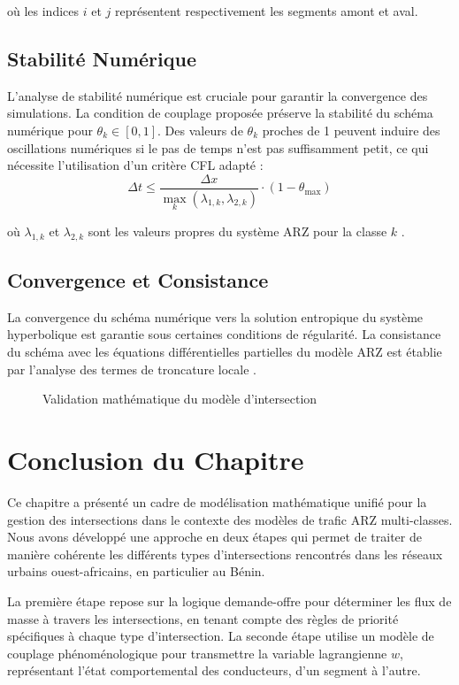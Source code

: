 où les indices $ i $ et $ j $ représentent respectivement les segments amont et aval.

\subsection{Stabilité Numérique}
L'analyse de stabilité numérique est cruciale pour garantir la convergence des simulations. La condition de couplage proposée préserve la stabilité du schéma numérique pour $ \theta_k \in [0,1] $. Des valeurs de $ \theta_k $ proches de 1 peuvent induire des oscillations numériques si le pas de temps n'est pas suffisamment petit, ce qui nécessite l'utilisation d'un critère CFL adapté :
\[
\Delta t \leq \frac{\Delta x}{\max_k(\lambda_{1,k}, \lambda_{2,k})} \cdot (1 - \theta_{\max})
\]

où $ \lambda_{1,k} $ et $ \lambda_{2,k} $ sont les valeurs propres du système ARZ pour la classe $ k $ \cite{FanHertySeibold2014}.

\subsection{Convergence et Consistance}
La convergence du schéma numérique vers la solution entropique du système hyperbolique est garantie sous certaines conditions de régularité. La consistance du schéma avec les équations différentielles partielles du modèle ARZ est établie par l'analyse des termes de troncature locale \cite{HoldenRisebro2015}.

\begin{figure}[htbp]
\centering
\caption{Validation mathématique du modèle d'intersection}
\label{fig:validation_mathematique}
\end{figure}

\section{Conclusion du Chapitre}
Ce chapitre a présenté un cadre de modélisation mathématique unifié pour la gestion des intersections dans le contexte des modèles de trafic ARZ multi-classes. Nous avons développé une approche en deux étapes qui permet de traiter de manière cohérente les différents types d'intersections rencontrés dans les réseaux urbains ouest-africains, en particulier au Bénin.

La première étape repose sur la logique demande-offre pour déterminer les flux de masse à travers les intersections, en tenant compte des règles de priorité spécifiques à chaque type d'intersection. La seconde étape utilise un modèle de couplage phénoménologique pour transmettre la variable lagrangienne $ w $, représentant l'état comportemental des conducteurs, d'un segment à l'autre.

